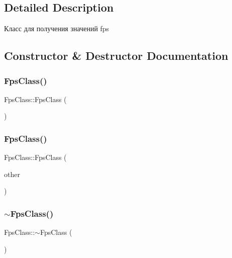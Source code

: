 \subsection{Detailed Description}
Класс для получения значений fps 

\subsection{Constructor \& Destructor Documentation}
\mbox{\label{class_fps_class_a5e9ace7473f055321c370acd8a02c2c6}} 
\subsubsection{\texorpdfstring{Fps\+Class()}{FpsClass()}\hspace{0.1cm}{\footnotesize\ttfamily [1/2]}}
{\footnotesize\ttfamily Fps\+Class\+::\+Fps\+Class (\begin{DoxyParamCaption}{ }\end{DoxyParamCaption})}

\mbox{\label{class_fps_class_a94b260cc3be5193330eecd6cee2d2092}} 
\subsubsection{\texorpdfstring{Fps\+Class()}{FpsClass()}\hspace{0.1cm}{\footnotesize\ttfamily [2/2]}}
{\footnotesize\ttfamily Fps\+Class\+::\+Fps\+Class (\begin{DoxyParamCaption}\item[{const \hyperlink{class_fps_class}{Fps\+Class} \&}]{other }\end{DoxyParamCaption})}

\mbox{\label{class_fps_class_a63fd2ecc65220fe7231e69be005b47e8}} 
\subsubsection{\texorpdfstring{$\sim$\+Fps\+Class()}{~FpsClass()}}
{\footnotesize\ttfamily Fps\+Class\+::$\sim$\+Fps\+Class (\begin{DoxyParamCaption}{ }\end{DoxyParamCaption})}



